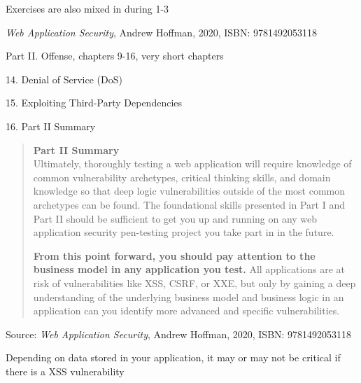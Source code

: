 \documentclass[Screen16to9,17pt]{foils}
\begin{document}
Exercises are also mixed in during 1-3


\emph{Web Application Security}, Andrew Hoffman, 2020, ISBN: 9781492053118

\begin{list1}
\item Part II. Offense, chapters 9-16, very short chapters
\item 14. Denial of Service (DoS)
\item 15. Exploiting Third-Party Dependencies
\item 16. Part II Summary
\end{list1}



\begin{quote}
{\bf Part II Summary}\\

Ultimately, thoroughly testing a web application will require knowledge of common vulnerability archetypes, critical thinking skills, and domain knowledge so that deep logic vulnerabilities outside of the most common archetypes can be found. The foundational skills presented in Part I and Part II should be sufficient to get you up and running on any web application security pen-testing project you take part in in the future.

{\bf From this point forward, you should pay attention to the business model in any application you test.} All applications are at risk of vulnerabilities like XSS, CSRF, or XXE, but only by gaining a deep understanding of the underlying business model and business logic in an application can you identify more advanced and specific
vulnerabilities.
\end{quote}
Source: \emph{Web Application Security}, Andrew Hoffman, 2020, ISBN: 9781492053118


\begin{list2}
\item Depending on data stored in your application, it may or may not be critical if there is a XSS vulnerability
\end{list2}


\end{document}

